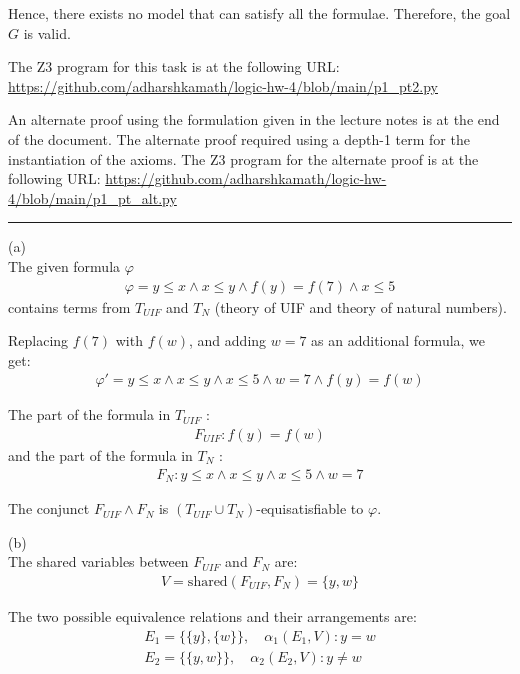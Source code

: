 \documentclass[12pt,letterpaper, onecolumn]{exam}
\newcommand{\link}[1]{{\color{blue}\href{#1}{#1}}}
\begin{document}
\begin{questions}
	Hence, there exists no model that can satisfy all the formulae.
	Therefore, the goal $G$ is valid.

	The Z3 program for this task is at the following URL: 
	\link{https://github.com/adharshkamath/logic-hw-4/blob/main/p1\_pt2.py}

	An alternate proof using the formulation given in the lecture notes is at the end of the document.
	The alternate proof required using a depth-1 term for the instantiation of the axioms.
	The Z3 program for the alternate proof is at the following URL: \link{https://github.com/adharshkamath/logic-hw-4/blob/main/p1\_pt\_alt.py}

    {\rule{17cm}{0.4pt}}

	\question[]
	\solutiontitle

	(a) \\
	The given formula $ \varphi $
	\begin{align*}
		\varphi = y \le x \land x \le y \land f(y) = f(7) \land x \le 5
	\end{align*}
	contains terms from $ T_{UIF} $ and $ T_{N} $ (theory of UIF and theory of natural numbers).

	Replacing $ f(7) $ with $ f(w) $, and adding $ w= 7 $ as an additional formula, we get:
	\begin{align*}
		\varphi' = y \le x \land x \le y \land x \le 5 \land w = 7 \land f(y) = f(w) 
	\end{align*} 

	The part of the formula in $ T_{UIF} $ :
	\begin{align*}
		F_{UIF} : f(y) = f(w)
	\end{align*}
	and the part of the formula in $ T_{N} $ :
	\begin{align*}
		F_{N} : y \le x \land x \le y \land x \le 5 \land w = 7
	\end{align*}

	The conjunct $ F_{UIF} \land F_{N} $ is $(T_{UIF} \cup T_N)$-equisatisfiable to $ \varphi $.

	(b) \\
	The shared variables between $ F_{UIF} $ and $ F_{N} $ are:
	\begin{align*}
		V = \text{shared}(F_{UIF}, F_{N}) = \{y, w\}
	\end{align*}

	The two possible equivalence relations and their arrangements are:
	\begin{align*}
		E_1 = \{\{y\}, \{w\}\}, \quad \alpha_1(E_1, V) : y = w\\
		E_2 = \{\{y, w\}\}, \quad \alpha_2(E_2, V) : y \neq w
	\end{align*}


\end{questions}
\end{document}
